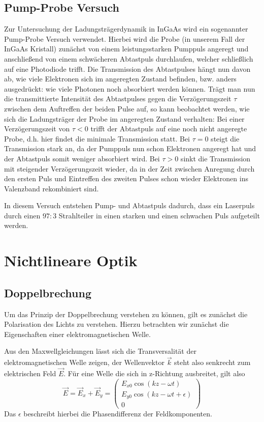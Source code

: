     \subsection{Pump-Probe Versuch}

Zur Untersuchung der Ladungsträgerdynamik in InGaAs wird ein sogenannter Pump-Probe Versuch verwendet. Hierbei wird die Probe (in unserem Fall der InGaAs Kristall) zunächst von einem leistungsstarken Pumppuls angeregt und anschließend von einem schwächeren Abtastpuls durchlaufen, welcher schließlich auf eine Photodiode trifft. Die Transmission des Abtastpulses hängt nun davon ab, wie viele Elektronen sich im angeregten Zustand befinden, bzw. anders ausgedrückt: wie viele Photonen noch absorbiert werden können. Trägt man nun die transmittierte Intensität des Abtastpulses gegen die Verzögerungszeit $\tau$ zwischen dem Auftreffen der beiden Pulse auf, so kann beobachtet werden, wie sich die Ladungsträger der Probe im angeregten Zustand verhalten: Bei einer Verzögerungszeit von $\tau<0$ trifft der Abtastpuls auf eine noch nicht angeregte Probe, d.h. hier findet die minimale Transmission statt. Bei $\tau=0$ steigt die Transmission stark an, da der Pumppuls nun schon Elektronen angeregt hat und der Abtastpuls somit weniger absorbiert wird. Bei $\tau>0$ sinkt die Transmission mit steigender Verzögerungszeit wieder, da in der Zeit zwischen Anregung durch den ersten Puls und Eintreffen des zweiten Pulses schon wieder Elektronen ins Valenzband rekombiniert sind.

In diesem Versuch entstehen Pump- und Abtastpuls dadurch, dass ein Laserpuls durch einen $97:3$ Strahlteiler in einen starken und einen schwachen Puls aufgeteilt werden.      

\autocite{Diels2006}

\section{Nichtlineare Optik}
    \subsection{Doppelbrechung}

Um das Prinzip der Doppelbrechung verstehen zu können, gilt es zunächst die 
Polarisation des Lichts zu verstehen. Hierzu betrachten wir zunächst die 
Eigenschaften einer elektromagnetischen Welle.\par
Aus den Maxwellgleichungen lässt sich die Transversalität der elektromagnetischen
Welle zeigen, der Wellenvektor $\vec{k}$ steht also senkrecht zum elektrischen 
Feld $\vec{E}$. Für eine Welle die sich in z-Richtung ausbreitet, gilt also
\[
    \vec{E} = \vec{E}_x + \vec{E}_y = 
      \begin{pmatrix}
          E_{x0} \cos(kz-\omega t)\\
          E_{y0} \cos(kz-\omega t + \epsilon)\\
          0
      \end{pmatrix}
\]
Das $\epsilon$ beschreibt hierbei die Phasendifferenz der Feldkomponenten.

